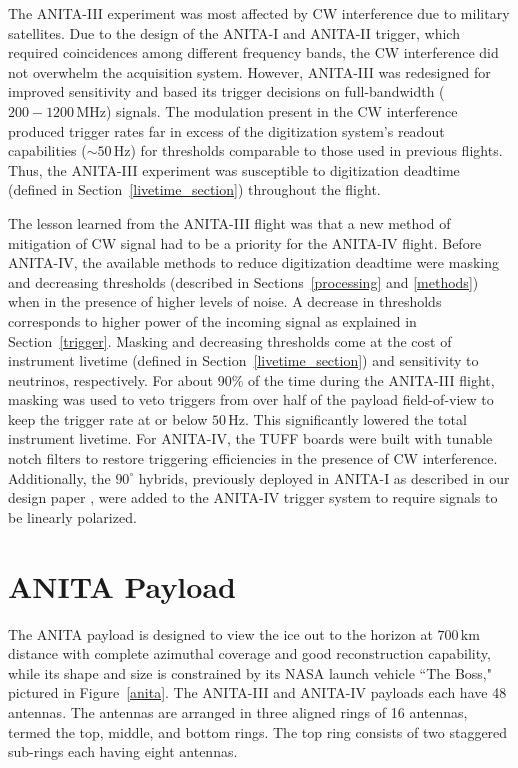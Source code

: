 \documentclass[preprint,12pt]{elsarticle}
\begin{document}
The ANITA-III experiment was most affected by CW interference due to military satellites.
Due to the design
of the ANITA-I and ANITA-II trigger, which required coincidences among different frequency bands, the CW interference did not overwhelm
the acquisition system. 
However, ANITA-III was redesigned for improved sensitivity and based its trigger decisions on full-bandwidth ($200 - 1200\,\mbox{MHz}$) signals. 
The modulation present in the CW interference produced trigger rates far in excess of the digitization system's readout
capabilities ($\sim50\,\mbox{Hz}$) for thresholds comparable to those used in previous flights. 
Thus, the ANITA-III experiment was susceptible to digitization deadtime (defined in Section~\ref{livetime_section}) throughout the flight. 

The lesson learned from the ANITA-III flight was
that a new method of mitigation of CW signal had to be a priority for the ANITA-IV flight. 
Before ANITA-IV, the available methods to reduce digitization deadtime were
masking
and decreasing thresholds (described in Sections~\ref{processing} and \ref{methods}) when in the presence of higher levels of noise. 
A decrease in thresholds corresponds to higher power of the incoming signal as explained in Section~\ref{trigger}. 
Masking and decreasing thresholds
come at the cost of instrument livetime (defined in Section~\ref{livetime_section}) and sensitivity to neutrinos, respectively. 
For about 90\% of the time during the ANITA-III flight,
masking was used 
to veto triggers from
over 
half of the payload field-of-view to keep the
trigger rate at or below $50\,\mbox{Hz}$. 
This significantly lowered the total instrument livetime. 
For ANITA-IV, the TUFF boards were built with
tunable notch filters to restore triggering efficiencies 
in the presence of CW interference. 
Additionally, the $90^{\circ}$ hybrids, previously deployed
 in ANITA-I as described in our design paper \cite{instrPaper}, were added to the ANITA-IV trigger system
 to require signals to be linearly polarized. 

\section{ANITA Payload}
\label{payload} 

The ANITA payload is designed to view the ice out to the horizon at $700\,\mathrm{km}$ distance with complete azimuthal coverage and good reconstruction capability, while its 
shape and size is constrained by its NASA launch vehicle ``The Boss," pictured in Figure~\ref{anita}. 
The ANITA-III and ANITA-IV payloads each have 48 antennas. 
The antennas are arranged in three aligned rings of 16 antennas, termed the top, middle, and bottom rings. 
The top ring consists of two staggered sub-rings each having eight antennas. 
\end{document}
